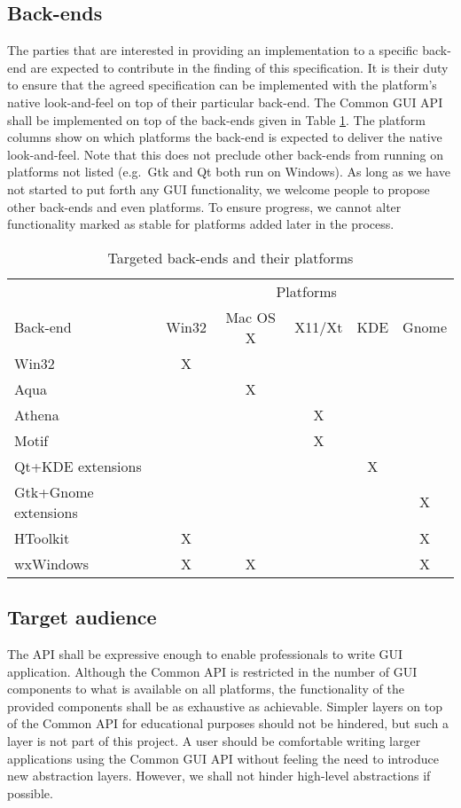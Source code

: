 \documentclass{article}
\begin{document}
\subsection{Back-ends}
The parties that are interested in providing an implementation to a
specific back-end are expected to contribute in the finding of this
specification. It is their duty to ensure that the agreed
specification can be implemented with the platform's native
look-and-feel on top of their particular back-end. The Common GUI API
shall be implemented on top of the back-ends given in Table
\ref{fig-backends}. The platform columns show on which platforms the
back-end is expected to deliver the native look-and-feel. Note that
this does not preclude other back-ends from running on platforms not
listed (e.g.~Gtk and Qt both run on Windows). As long as we have not
started to put forth any GUI functionality, we welcome people to
propose other back-ends and even platforms. To ensure progress, we
cannot alter functionality marked as stable for platforms added later
in the process.

\begin{table}
  \begin{center}
    \begin{tabular}{|l||c|c|c|c|c|}\hline
      & \multicolumn{5}{c|}{Platforms}\\
      Back-end & Win32 & Mac OS X & X11/Xt & KDE & Gnome \\ \hline
      Win32 & X & & & &\\
      Aqua  & & X & & &\\
      Athena & & & X & &\\
      Motif & & & X & & \\
      Qt+KDE extensions   & & & & X & \\
      Gtk+Gnome extensions  & & & & &  X \\
      HToolkit & X & & & & X \\
      wxWindows & X & X & & & X \\ \hline
    \end{tabular}
  \end{center}
  \caption{\label{fig-backends} Targeted back-ends and their platforms}
\end{table}

\subsection{Target audience}
The API shall be expressive enough to enable professionals to write
GUI application. Although the Common API is restricted in the number
of GUI components to what is available on all platforms, the
functionality of the provided components shall be as exhaustive as
achievable. Simpler layers on top of the Common API for educational
purposes should not be hindered, but such a layer is not part of this
project. A user should be comfortable writing larger applications using
the Common GUI API without feeling the need to introduce new
abstraction layers. However, we shall not hinder high-level
abstractions if possible.
\end{document}
